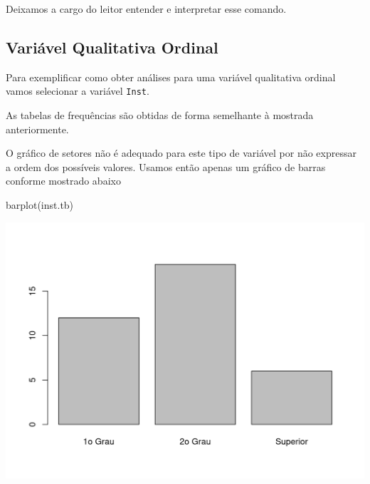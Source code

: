 \documentclass[
  10pt,
  a4paper]{book}
\newenvironment{Shaded}{\begin{snugshade}}{\end{snugshade}}
\newcommand{\DecValTok}[1]{\textcolor[rgb]{0.00,0.00,0.81}{#1}}
\newcommand{\DocumentationTok}[1]{\textcolor[rgb]{0.56,0.35,0.01}{\textbf{\textit{#1}}}}
\newcommand{\FloatTok}[1]{\textcolor[rgb]{0.00,0.00,0.81}{#1}}
\newcommand{\FunctionTok}[1]{\textcolor[rgb]{0.00,0.00,0.00}{#1}}
\newcommand{\NormalTok}[1]{#1}
\newcommand{\OtherTok}[1]{\textcolor[rgb]{0.56,0.35,0.01}{#1}}
\newcommand{\SpecialCharTok}[1]{\textcolor[rgb]{0.00,0.00,0.00}{#1}}
\begin{document}
Deixamos a cargo do leitor entender e interpretar esse comando.

\hypertarget{variuxe1vel-qualitativa-ordinal}{%
\subsection{Variável Qualitativa Ordinal}\label{variuxe1vel-qualitativa-ordinal}}

Para exemplificar como obter análises para uma variável qualitativa
ordinal vamos selecionar a variável \texttt{Inst}.

As tabelas de frequências são obtidas de forma semelhante à mostrada
anteriormente.

\begin{Shaded}
\end{Shaded}

O gráfico de setores não é adequado para este tipo de variável por não
expressar a ordem dos possíveis valores. Usamos então apenas um gráfico
de barras conforme mostrado abaixo

\begin{Shaded}
\begin{Highlighting}[]
\FunctionTok{barplot}\NormalTok{(inst.tb)}
\end{Highlighting}
\end{Shaded}

\begin{center}\includegraphics{figures/unnamed-chunk-296-1} \end{center}
\end{document}

